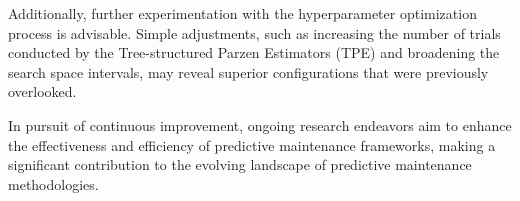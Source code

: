\documentclass{IEEEtran}
\begin{document}
        Additionally, further experimentation with the hyperparameter optimization process is advisable. Simple adjustments, such as increasing the number of trials conducted by the Tree-structured Parzen Estimators (TPE) and broadening the search space intervals, may reveal superior configurations that were previously overlooked.

        In pursuit of continuous improvement, ongoing research endeavors aim to enhance the effectiveness and efficiency of predictive maintenance frameworks, making a significant contribution to the evolving landscape of predictive maintenance methodologies.

    
    
\end{document}
